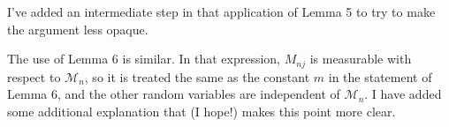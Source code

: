 \documentclass[12pt]{article}
\begin{document}
\begin{enumerate}
  I've added an intermediate step in that application of Lemma 5 to
  try to make the argument less opaque.

  The use of Lemma 6 is similar. In that expression, $M_{nj}$ is
  measurable with respect to $\mathcal{M}_n$, so it is treated the
  same as the constant $m$ in the statement of Lemma 6, and the other
  random variables are independent of $\mathcal{M}_n$. I have added
  some additional explanation that (I hope!) makes this point more clear.

\end{enumerate}
\end{document}
